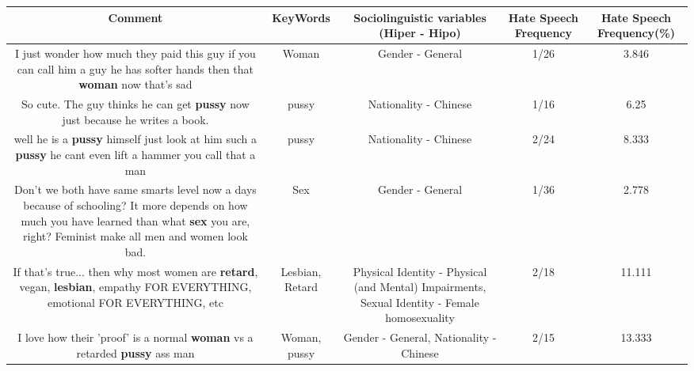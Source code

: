 \documentclass[11pt]{article}
\newlength\mylength
\begin{document}
\begin{center}
\setlength\mylength{\dimexpr\textwidth - 1\arrayrulewidth - 50\tabcolsep}
\begin{longtable}{|C{.65\mylength}|C{.30\mylength}|C{.12\mylength}|C{.12\mylength}|C{.12\mylength}|}
\hline
\textbf{Comment} & \textbf{KeyWords} & \textbf{Sociolinguistic variables (Hiper - Hipo)}  & \textbf{Hate Speech Frequency} & \textbf{Hate Speech Frequency(\%)} \\
\hline{}\small I just wonder how much they paid this guy if you can call him a guy he has softer hands then that \textbf{woman} now that's sad\normalsize   & Woman & Gender - General & 1/26 & 3.846 \\  \hline
  \small So cute. The guy thinks he can get \textbf{pussy} now just because he writes a book.\normalsize   & pussy & Nationality - Chinese & 1/16 & 6.25 \\  \hline
  \small well he is a \textbf{pussy} himself just look at him such a \textbf{pussy} he cant even lift a hammer you call that a man\normalsize   & pussy & Nationality - Chinese & 2/24 & 8.333 \\  \hline
  \small Don't we both have same smarts level now a days because of schooling? It more depends on how much you have learned than what \textbf{sex} you are, right? Feminist make all men and women look bad.\normalsize   & Sex & Gender - General & 1/36 & 2.778 \\  \hline
  \small If that's true... then why most women are \textbf{retard}, vegan, \textbf{lesbian}, empathy FOR EVERYTHING, emotional FOR EVERYTHING, etc\normalsize   & Lesbian, Retard & Physical Identity - Physical (and Mental) Impairments, Sexual Identity - Female homosexuality & 2/18 & 11.111 \\  \hline
  \small I love how their 'proof' is a normal \textbf{woman} vs a retarded \textbf{pussy} ass man\normalsize   & Woman, pussy & Gender - General, Nationality - Chinese & 2/15 & 13.333 \\  \hline

\end{longtable}
\end{center}
\end{document}
